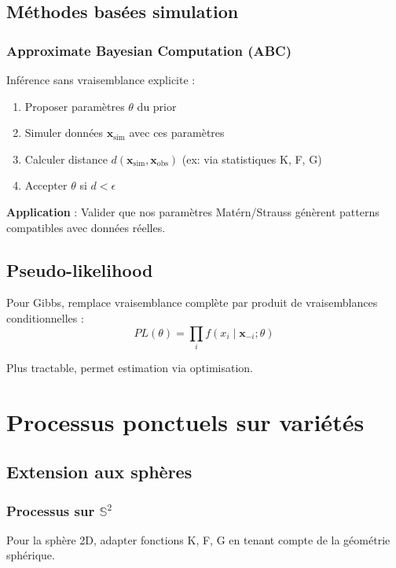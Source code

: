 \subsection{Méthodes basées simulation}

\subsubsection{Approximate Bayesian Computation (ABC)}

Inférence sans vraisemblance explicite :
\begin{enumerate}
    \item Proposer paramètres $\theta$ du prior
    \item Simuler données $\mathbf{x}_{\text{sim}}$ avec ces paramètres
    \item Calculer distance $d(\mathbf{x}_{\text{sim}}, \mathbf{x}_{\text{obs}})$ (ex: via statistiques K, F, G)
    \item Accepter $\theta$ si $d < \epsilon$
\end{enumerate}

\textbf{Application} : Valider que nos paramètres Matérn/Strauss génèrent patterns compatibles avec données réelles.

\subsection{Pseudo-likelihood}

Pour Gibbs, remplace vraisemblance complète par produit de vraisemblances conditionnelles :
\[
PL(\theta) = \prod_i f(x_i \mid \mathbf{x}_{-i}; \theta)
\]

Plus tractable, permet estimation via optimisation.

\section{Processus ponctuels sur variétés}

\subsection{Extension aux sphères}

\subsubsection{Processus sur $\mathbb{S}^2$}

Pour la sphère 2D, adapter fonctions K, F, G en tenant compte de la géométrie sphérique.

